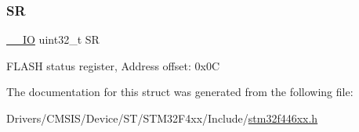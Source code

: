 \subsubsection{\texorpdfstring{SR}{SR}}
{\footnotesize\ttfamily \mbox{\hyperlink{core__sc300_8h_aec43007d9998a0a0e01faede4133d6be}{\+\_\+\+\_\+\+IO}} uint32\+\_\+t SR}

F\+L\+A\+SH status register, Address offset\+: 0x0C 

The documentation for this struct was generated from the following file\+:\begin{DoxyCompactItemize}
\item 
Drivers/\+C\+M\+S\+I\+S/\+Device/\+S\+T/\+S\+T\+M32\+F4xx/\+Include/\mbox{\hyperlink{stm32f446xx_8h}{stm32f446xx.\+h}}\end{DoxyCompactItemize}
